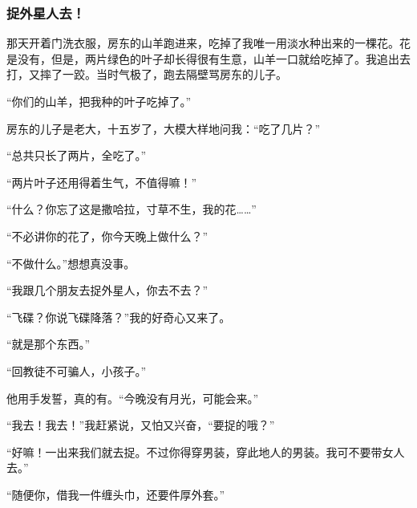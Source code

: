 \subsubsection*{捉外星人去！}
\par 那天开着门洗衣服，房东的山羊跑进来，吃掉了我唯一用淡水种出来的一棵花。花是没有，但是，两片绿色的叶子却长得很有生意，山羊一口就给吃掉了。我追出去打，又摔了一跤。当时气极了，跑去隔壁骂房东的儿子。
\par “你们的山羊，把我种的叶子吃掉了。”
\par 房东的儿子是老大，十五岁了，大模大样地问我：“吃了几片？”
\par “总共只长了两片，全吃了。”
\par “两片叶子还用得着生气，不值得嘛！”
\par “什么？你忘了这是撒哈拉，寸草不生，我的花……”
\par “不必讲你的花了，你今天晚上做什么？”
\par “不做什么。”想想真没事。
\par “我跟几个朋友去捉外星人，你去不去？”
\par “飞碟？你说飞碟降落？”我的好奇心又来了。
\par “就是那个东西。”
\par “回教徒不可骗人，小孩子。”
\par 他用手发誓，真的有。“今晚没有月光，可能会来。”
\par “我去！我去！”我赶紧说，又怕又兴奋，“要捉的哦？”
\par “好嘛！一出来我们就去捉。不过你得穿男装，穿此地人的男装。我可不要带女人去。”
\par “随便你，借我一件缠头巾，还要件厚外套。”
